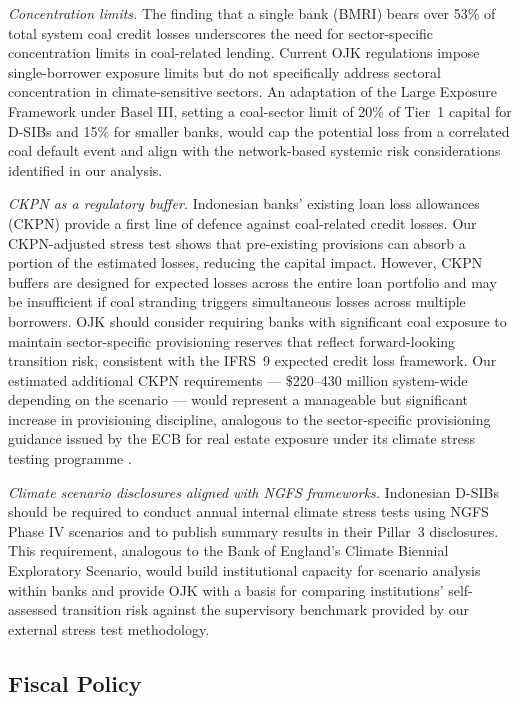 \textit{Concentration limits.} The finding that a single bank (BMRI) bears over 53\% of total system coal credit losses underscores the need for sector-specific concentration limits in coal-related lending. Current OJK regulations impose single-borrower exposure limits but do not specifically address sectoral concentration in climate-sensitive sectors. An adaptation of the Large Exposure Framework under Basel III, setting a coal-sector limit of 20\% of Tier~1 capital for D-SIBs and 15\% for smaller banks, would cap the potential loss from a correlated coal default event and align with the network-based systemic risk considerations identified in our analysis.

\textit{CKPN as a regulatory buffer.} Indonesian banks' existing loan loss allowances (CKPN) provide a first line of defence against coal-related credit losses. Our CKPN-adjusted stress test shows that pre-existing provisions can absorb a portion of the estimated losses, reducing the capital impact. However, CKPN buffers are designed for expected losses across the entire loan portfolio and may be insufficient if coal stranding triggers simultaneous losses across multiple borrowers. OJK should consider requiring banks with significant coal exposure to maintain sector-specific provisioning reserves that reflect forward-looking transition risk, consistent with the IFRS~9 expected credit loss framework. Our estimated additional CKPN requirements --- \$220--430 million system-wide depending on the scenario --- would represent a manageable but significant increase in provisioning discipline, analogous to the sector-specific provisioning guidance issued by the ECB for real estate exposure under its climate stress testing programme \citep{ECB2022}.

\textit{Climate scenario disclosures aligned with NGFS frameworks.} Indonesian D-SIBs should be required to conduct annual internal climate stress tests using NGFS Phase IV scenarios and to publish summary results in their Pillar~3 disclosures. This requirement, analogous to the Bank of England's Climate Biennial Exploratory Scenario, would build institutional capacity for scenario analysis within banks and provide OJK with a basis for comparing institutions' self-assessed transition risk against the supervisory benchmark provided by our external stress test methodology.

\subsection{Fiscal Policy}

